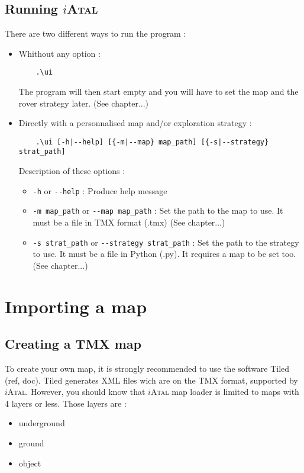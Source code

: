 \documentclass[a4paper,11pt]{article}
\newcommand\iAtal{$i$\textsc{Atal}}
\begin{document}
\subsection{Running \iAtal{}}
There are two different ways to run the program :
\begin{itemize}
\item Whithout any option :
\begin{verbatim}
	.\ui
\end{verbatim}
  The program will then start empty and you will have to set the map
  and the rover strategy later. (See chapter...)
  
\item Directly with a personnalised map and/or exploration strategy :
\begin{verbatim}
	.\ui [-h|--help] [{-m|--map} map_path] [{-s|--strategy} strat_path]
\end{verbatim}
  Description of these options :
  \begin{itemize}
  \item \verb!-h! or \verb!--help! : Produce help message
  \item \verb!-m map_path! or \verb!--map map_path! : Set the path to
    the map to use. It must be a file in TMX format (.tmx) (See
    chapter...)
  \item \verb!-s strat_path! or \verb!--strategy strat_path! : Set the
    path to the strategy to use. It must be a file in Python (.py). It
    requires a map to be set too. (See chapter...)
  \end{itemize}
\end{itemize}

\section{Importing a map}

\subsection{Creating a TMX map}

To create your own map, it is strongly recommended to use the software
Tiled (ref, doc).  Tiled generates XML files wich are on the TMX
format, supported by \iAtal{}. However, you should know that \iAtal{} map
loader is limited to maps with 4 layers or less. Those layers are :
\begin{itemize}
 \item underground
 \item ground
 \item object
\end{itemize}
\label{avaibleLayers}
\end{document}
